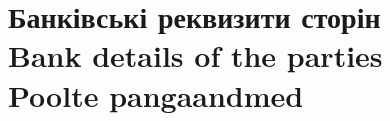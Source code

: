 %
%
%
%
%
\pagebreak
\section{Банківські реквизити сторін\\Bank details of the parties\\Poolte pangaandmed}
\label{app:bank}
